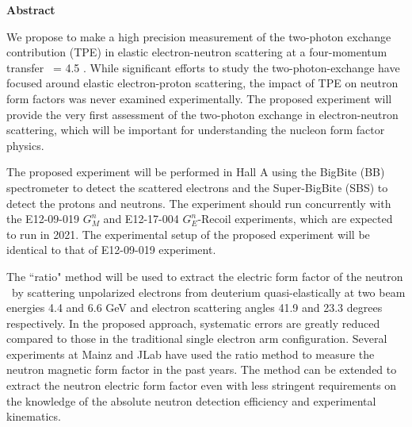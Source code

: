 \begin{center}
{{\large {\bf Abstract}}} 
\end{center}

We propose to make a high precision measurement of the two-photon exchange contribution (TPE) in elastic electron-neutron scattering at a four-momentum transfer \qsq~= 4.5 \gevcsq. 
While significant efforts to study the two-photon-exchange have focused around elastic electron-proton scattering, the impact of TPE on neutron form factors was never examined experimentally. 
The proposed experiment will provide the very first assessment of the two-photon exchange in electron-neutron scattering, which will be important for understanding the nucleon form factor physics. \par
The proposed experiment will be performed in Hall A using the BigBite (BB) spectrometer to detect the scattered electrons and the Super-BigBite (SBS) to detect the protons and neutrons. 
The experiment should run concurrently with the E12-09-019 $G_M^n$ and E12-17-004 $G_E^n$-Recoil experiments, which are expected to run in 2021. 
The experimental setup of the proposed experiment will be identical to that of E12-09-019 experiment. \par
The ``ratio" method will be used to extract the electric form factor of the neutron \gen~by scattering unpolarized electrons from deuterium quasi-elastically at two beam energies 4.4 and 6.6 GeV and electron scattering angles 41.9 and 23.3 degrees respectively. 
In the proposed approach, systematic errors are greatly reduced compared to those in the traditional single electron arm configuration. 
Several experiments at Mainz and JLab have used the ratio method to measure the neutron magnetic form factor in the past years. 
The method can be extended to extract the neutron electric form factor even with less stringent requirements 
on the knowledge of the absolute neutron detection efficiency and experimental kinematics.  

